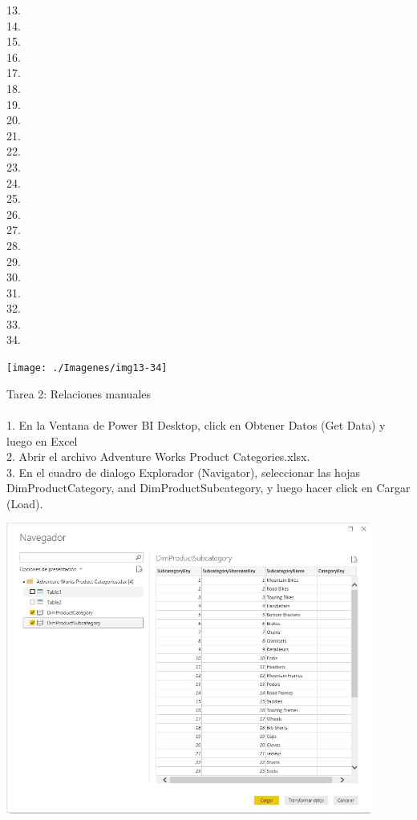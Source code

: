 \begin{itemize}
    13.  \\
    14. \\
    15. \\
    16. \\
    17.  \\
    18. \\
    19. \\
    20. \\
    21.  \\
    22. \\
    23. \\
    24. \\
    25.  \\
    26. \\
    27. \\
    28. \\
    29.  \\
    30. \\
    31. \\
    32. \\
    33.  \\
    34. \\

\end{itemize} 
    
\begin{center}
\texttt{[image: ./Imagenes/img13-34]} 
\end{center}
    
      
\begin{itemize}
   Tarea 2: Relaciones manuales\\\\
   1.   En la Ventana de Power BI Desktop, click en Obtener Datos (Get Data) y luego en Excel\\
   2.   Abrir el archivo Adventure Works Product Categories.xlsx.\\
   3.   En el cuadro de dialogo Explorador (Navigator), seleccionar las hojas DimProductCategory, and
DimProductSubcategory, y luego hacer click en Cargar (Load).\\
   
\end{itemize} 

    
\begin{center}
\includegraphics[width=12cm]{./Imagenes/img2-1-3} 
\end{center}
   
